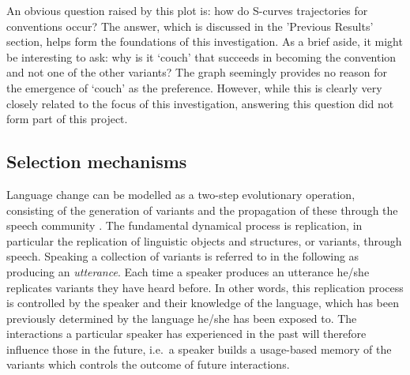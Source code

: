 \documentclass[12pt]{article}
\begin{document}
An obvious question raised by this plot is: how do S-curves trajectories for conventions occur? The answer, which is discussed in the 'Previous Results' section, helps form the foundations of this investigation. As a brief aside, it might be interesting to ask: why is it `couch' that succeeds in becoming the convention and not one of the other variants? The graph seemingly provides no reason for the emergence of `couch' as the preference. However, while this is clearly very closely related to the focus of this investigation, answering this question did not form part of this project.




\subsection{Selection mechanisms}
Language change can be modelled as a two-step evolutionary operation, consisting of the generation of variants and the propagation of these through the speech community \cite{croft}. The fundamental dynamical process is replication, in particular the replication of linguistic objects and structures, or variants, through speech. Speaking a collection of variants is referred to in the following as producing an \emph{utterance}. Each time a speaker produces an utterance he/she replicates variants they have heard before. In other words, this replication process is controlled by the speaker and their knowledge of the language, which has been previously determined by the language he/she has been exposed to. The interactions a particular speaker has experienced in the past will therefore influence those in the future, i.e.\ a speaker builds a usage-based memory of the variants which controls the outcome of future interactions. 
\end{document}
